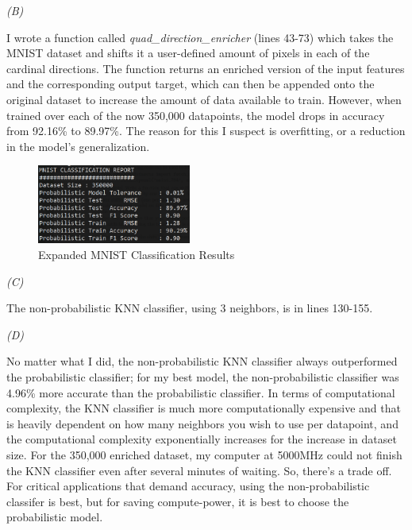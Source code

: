 \documentclass[10pt]{article}
\begin{document}
\smallskip
\textit{(B)}

I wrote a function called \textit{quad\_direction\_enricher} (lines 43-73) which takes the MNIST dataset and shifts it a user-defined amount of pixels in each of the cardinal directions. The function returns an enriched version of the input features and the corresponding output target, which can then be appended onto the original dataset to increase the amount of data available to train. However, when trained over each of the now 350,000 datapoints, the model drops in accuracy from 92.16\% to 89.97\%. The reason for this I suspect is overfitting, or a reduction in the model's generalization.

\begin{figure}[h]
    \includegraphics[width=0.45\textwidth]{../logs/mnist_expanded.png}
    \centering
    \caption{Expanded MNIST Classification Results}
    \label{fig:q2_results}
\end{figure}

\smallskip
\textit{(C)}

\smallskip
The non-probabilistic KNN classifier, using 3 neighbors, is in lines 130-155.

\clearpage

\smallskip
\textit{(D)}

\smallskip
No matter what I did, the non-probabilistic KNN classifier always outperformed the probabilistic classifier; for my best model, the non-probabilistic classifier was 4.96\% more accurate than the probabilistic classifier. In terms of computational complexity, the KNN classifier is much more computationally expensive and that is heavily dependent on how many neighbors you wish to use per datapoint, and the computational complexity exponentially increases for the increase in dataset size. For the 350,000 enriched dataset, my computer at 5000MHz could not finish the KNN classifier even after several minutes of waiting. So, there's a trade off. For critical applications that demand accuracy, using the non-probabilistic classifer is best, but for saving compute-power, it is best to choose the probabilistic model.
\end{document}
